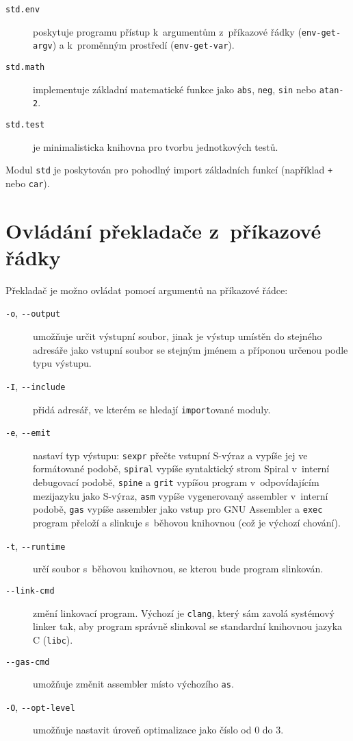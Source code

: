 \begin{description}
  \item[\texttt{std.env}] poskytuje programu přístup k~argumentům z~příkazové
    řádky (\texttt{env-get-argv}) a k~proměnným prostředí (\texttt{env-get-var}).

  \item[\texttt{std.math}] implementuje základní matematické funkce jako
    \texttt{abs}, \texttt{neg}, \texttt{sin} nebo \texttt{atan-2}.

  \item[\texttt{std.test}] je minimalisticka knihovna pro tvorbu jednotkových
    testů.
\end{description}

Modul \texttt{std} je poskytován pro pohodlný import základních funkcí
(například \texttt{+} nebo \texttt{car}).

\section{Ovládání překladače z~příkazové řádky}

Překladač je možno ovládat pomocí argumentů na příkazové řádce:

\begin{description}
  \item[\texttt{-o}, \texttt{-{}-output}] umožňuje určit výstupní soubor, jinak je
    výstup umístěn do stejného adresáře jako vstupní soubor se stejným jménem a
    příponou určenou podle typu výstupu.
  \item[\texttt{-I}, \texttt{-{}-include}] přidá adresář, ve kterém se hledají
    \texttt{import}ované moduly.
  \item[\texttt{-e}, \texttt{-{}-emit}] nastaví typ výstupu: \texttt{sexpr} přečte
    vstupní S-výraz a vypíše jej ve formátované podobě, \texttt{spiral} vypíše
    syntaktický strom Spiral v~interní debugovací podobě, \texttt{spine} a
    \texttt{grit} vypíšou program v~odpovídajícím mezijazyku jako S-výraz,
    \texttt{asm} vypíše vygenerovaný assembler v~interní podobě, \texttt{gas}
    vypíše assembler jako vstup pro GNU Assembler a \texttt{exec} program
    přeloží a slinkuje s~běhovou knihovnou (což je výchozí chování).
  \item[\texttt{-t}, \texttt{-{}-runtime}] určí soubor s~běhovou knihovnou, se
    kterou bude program slinkován.
  \item[\texttt{-{}-link-cmd}] změní linkovací program. Výchozí je \texttt{clang},
    který sám zavolá systémový linker tak, aby program správně slinkoval se
    standardní knihovnou jazyka C (\texttt{libc}).
  \item[\texttt{-{}-gas-cmd}] umožňuje změnit assembler místo výchozího
    \texttt{as}.
  \item[\texttt{-O}, \texttt{-{}-opt-level}] umožňuje nastavit úroveň optimalizace
    jako číslo od 0 do 3.
\end{description}

